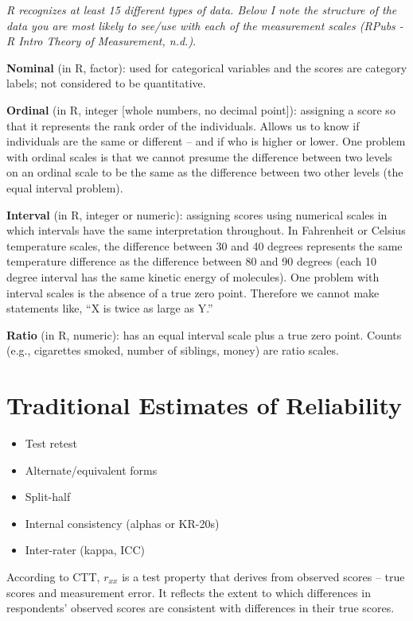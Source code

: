\documentclass[
  english,
]{book}
\providecommand{\tightlist}{%
  \setlength{\itemsep}{0pt}\setlength{\parskip}{0pt}}
\begin{document}
\emph{R recognizes at least 15 different types of data. Below I note the structure of the data you are most likely to see/use with each of the measurement scales \citep{noauthor_rpubs_nodate}(RPubs - R Intro Theory of Measurement, n.d.)}.

\textbf{Nominal} (in R, factor): used for categorical variables and the scores are category labels; not considered to be quantitative.

\textbf{Ordinal} (in R, integer {[}whole numbers, no decimal point{]}): assigning a score so that it represents the rank order of the individuals. Allows us to know if individuals are the same or different -- and if who is higher or lower. One problem with ordinal scales is that we cannot presume the difference between two levels on an ordinal scale to be the same as the difference between two other levels (the equal interval problem).

\textbf{Interval} (in R, integer or numeric): assigning scores using numerical scales in which intervals have the same interpretation throughout. In Fahrenheit or Celsius temperature scales, the difference between 30 and 40 degrees represents the same temperature difference as the difference between 80 and 90 degrees (each 10 degree interval has the same kinetic energy of molecules). One problem with interval scales is the absence of a true zero point. Therefore we cannot make statements like, ``X is twice as large as Y.''

\textbf{Ratio} (in R, numeric): has an equal interval scale plus a true zero point. Counts (e.g., cigarettes smoked, number of siblings, money) are ratio scales.

\hypertarget{traditional-estimates-of-reliability}{%
\section{Traditional Estimates of Reliability}\label{traditional-estimates-of-reliability}}

\begin{itemize}
\tightlist
\item
  Test retest
\item
  Alternate/equivalent forms
\item
  Split-half
\item
  Internal consistency (alphas or KR-20s)
\item
  Inter-rater (kappa, ICC)
\end{itemize}

According to CTT, \(r_{xx}\) is a test property that derives from observed scores -- true scores and measurement error. It reflects the extent to which differences in respondents' observed scores are consistent with differences in their true scores.
\end{document}
